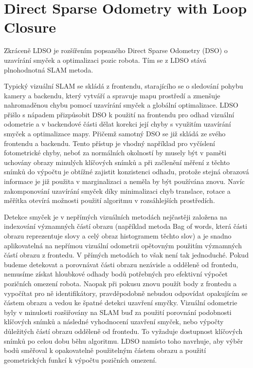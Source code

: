 \documentclass[12pt,a4paper]{report}
\begin{document}
\section{Direct Sparse Odometry with Loop Closure}
Zkráceně LDSO je rozšířením popsaného Direct Sparse Odometry (DSO) o uzavírání smyček a optimalizaci pozic robota. Tím se z LDSO stává plnohodnotná SLAM metoda.

Typický vizuální SLAM se skládá z frontendu, starajícího se o sledování pohybu kamery a backendu, který vytváří a spravuje mapu prostředí a zmenšuje nahromaděnou chybu pomocí uzavírání smyček a globální optimalizace. LDSO přišlo s nápadem přizpů\-sobit DSO k použití na frontendu pro odhad vizuální odometrie a v backendové části dělat korekci její chyby s využitím uzavírání smyček a optimalizace mapy. Přičemž samotný DSO se již skládá ze svého frontendu a backendu. Tento přístup je vhodný například pro vyčíslení fotometrické chyby, neboť za normálních okolností by musely být v paměti uchovány obrazy minulých klíčových snímků a při začlenění měření z těchto snímků do výpočtu je obtížné zajistit konzistenci odhadu, protože stejná obrazová informace je již použita v marginalizaci a neměla by být používána znovu. Navíc zakomponování uzavírání smyček díky minimalizaci chyb translace, rotace a měřítka otevírá možnosti použití algoritmu v rozsáhlejších prostředích.

Detekce smyček je v nepřímých vizuálních metodách nejčastěji založena na indexování významných částí obrazu (například metoda Bag of words, která části obrazu reprezentuje slovy a celý obraz histogramem těchto slov) a je snadno aplikovatelná na nepřímou vizuální odometrii opětovným použitím významných částí obrazu z frontedu. V přímých metodách to však není tak jednoduché. Pokud budeme detekovat a porovnávat části obrazu nezávisle a odděleně od frontedu, nemusíme získat hloubkové odhady bodů potřebných pro efektivní výpočet pozičních omezení robota. Naopak při pokusu znovu použít body z frontedu a vypočítat pro ně identifikátory, pravděpodobně nebudou odpovídat opakujícím se částem obrazu a vedou ke špatné detekci uzavření smyčky. Vizuální odometrie byly v minulosti rozšiřovány na SLAM buď za použití porovnání podobnosti klíčových snímků a následné vyhodnocení uzavření smyček, nebo výpočty důležitých částí obrazu odděleně od frontedu. To vyžaduje dostupnost klíčových snímků po celou dobu běhu algoritmu. LDSO namísto toho navrhuje, aby výběr bodů směřoval k opakovatelně použitelným částem obrazu a použití geometrických funkcí k výpočtu pozičních omezení.
\end{document}
